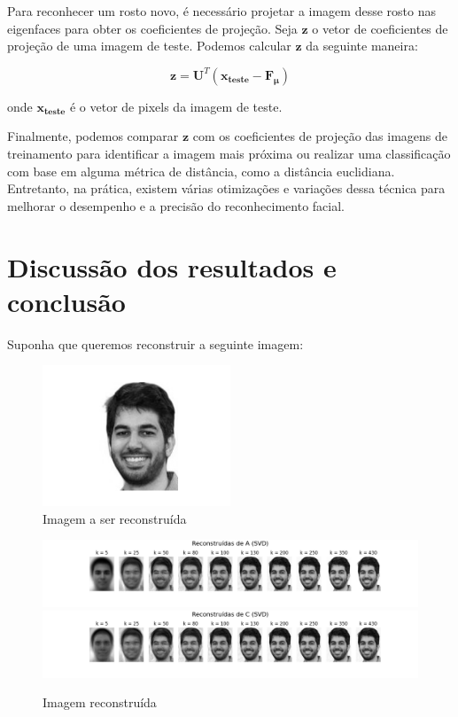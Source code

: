 \documentclass[12pt]{article}
\begin{document}
            

            Para reconhecer um rosto novo, é necessário projetar a imagem desse rosto nas eigenfaces para obter os coeficientes de projeção. Seja $\boldsymbol{z}$ o vetor de coeficientes de projeção de uma imagem de teste. Podemos calcular $\boldsymbol{z}$ da seguinte maneira:
 
            $$
            \boldsymbol{z} = \boldsymbol{U}^{T}(\boldsymbol{x_{teste}} - \boldsymbol{F_\mu})
            $$


            onde $\boldsymbol{x_{teste}}$ é o vetor de pixels da imagem de teste.

            Finalmente, podemos comparar $\boldsymbol{z}$ com os coeficientes de projeção das imagens de treinamento para identificar a imagem mais próxima ou realizar uma classificação com base em alguma métrica de distância, como a distância euclidiana. Entretanto, na prática, existem várias otimizações e variações dessa técnica para melhorar o desempenho e a precisão do reconhecimento facial.
            
        
    \section{Discussão dos resultados e conclusão}
        Suponha que queremos reconstruir a seguinte imagem:

        \begin{figure}[H]
                  \centering
                  \includegraphics[width=0.5\textwidth]{img/MAIN_6.png}
                  \caption{Imagem a ser reconstruída}
                  \label{fig:exemplo}
        \end{figure}
        
        \begin{figure}[H]
                  \centering
                  \includegraphics[width=1\textwidth]{img/MAIN_7.png}
                  \includegraphics[width=1\textwidth]{img/MAIN_8.png}
                  \caption{Imagem reconstruída}
                  \label{fig:exemplo}
        \end{figure}
\end{document}
